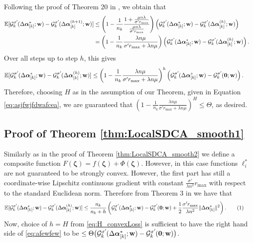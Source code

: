 \documentclass{article}
\newcommand{\Exp}{\mathbb{E}}                      %
\newcommand\tagthis{\addtocounter{equation}{1}\tag{\theequation}}
\newcommand{\wv}{ {\bf w}}
\newcommand{\alphav}{ {\boldsymbol \alpha}}
\newcommand{\zetav}{ {\boldsymbol \zeta}}
\newcommand{\0}{ {\bf 0}}
\newcommand{\vsubset}[2]{#1_{[#2]}}
\newcommand{\vc}[2]{#1^{(#2)}}                   %
\newcommand{\Ggk}{\mathcal{G}^{\sigma'}_k\hspace{-0.08em}}
\theoremstyle{plain}
\theoremstyle{definition}
\begin{document}
{Following the
 proof of Theorem 20 in \cite{richtarikBigData}, 
we obtain that
\begin{align*}
\Exp[\Ggk( 
   \vsubset{\Delta \alphav^*}{k}; \wv)
-   \Ggk( 
\vc{
  \vsubset{\Delta \alphav}{k}
  }{h+1}; \wv)
  ]
&\leq 
\left(
1-\frac1{n_k}
 \frac{1+\frac{\mu n \lambda}{\sigma' r_{\max}}}
      {\frac{\mu n \lambda}{\sigma' r_{\max}}}
\right)
\left(
\Ggk( 
   \vsubset{\Delta \alphav^*}{k};\wv)
-   \Ggk( 
\vc{
  \vsubset{\Delta \alphav}{k}
  }{h}; \wv)
\right) 
\\
&=
\left(
1-\frac1{n_k}
 \frac
      {    \lambda n \mu }
      {\sigma' r_{\max}+ \lambda n \mu }
\right)
\left(
\Ggk( 
   \vsubset{\Delta \alphav^*}{k}; \wv)
-   \Ggk( 
\vc{
  \vsubset{\Delta \alphav}{k}
  }{h}; \wv)
\right). 
\end{align*}
Over all steps up to step $h$, this gives
\begin{align*}
\Exp[\Ggk( 
   \vsubset{\Delta \alphav^*}{k}; \wv)
-   \Ggk( 
\vc{
  \vsubset{\Delta \alphav}{k}
  }{h}; \wv)
  ]
&\leq 
\left(
1-\frac1{n_k}
 \frac
      {    \lambda n \mu }
      {\sigma' r_{\max}+ \lambda n \mu }
\right)^h
\left(
\Ggk( 
   \vsubset{\Delta \alphav^*}{k}; \wv)
-   \Ggk({\bf 0}; \wv)
\right). 
\end{align*}
 Therefore, choosing 
 $H$ as in the assumption of our Theorem, given in Equation
 \eqref{eq:asjfwjfdwafcea},
 we are guaranteed that
 $\left(
1-\frac1{n_k}
 \frac
      {    \lambda n \mu }
      {\sigma' r_{\max}+ \lambda n \mu }
\right)^H \leq \Theta$, as desired. 


\subsection{Proof of Theorem \ref{thm:LocalSDCA_smooth1}
}
Similarly as in the 
proof of Theorem 
\ref{thm:LocalSDCA_smooth2} 
we define a composite function $F(\zetav)
= f(\zetav)+\Phi(\zetav) $.
However, in this case functions
$\ell_i^*$ are not guaranteed to be strongly convex.
However, the first part has still a coordinate-wise Lipschitz continuous gradient with constant
$ \frac{\sigma'}{\lambda n^2} r_{\max}$
with respect to the standard Euclidean norm.
Therefore from Theorem 3 in \cite{TTR:IMPROVRED}
we have that
\begin{align*}
\Exp[\Ggk( 
   \vsubset{\Delta \alphav^*}{k}; \wv)
-   \Ggk( 
\vc{
  \vsubset{\Delta \alphav}{k}
  }{h}; \wv)
  ]
&\leq 
 \frac{n_k}{n_k+h}
 \left(
 \Ggk( 
   \vsubset{\Delta \alphav^*}{k}; \wv)
-   \Ggk( {\bf 0}; \wv)
  +\frac12 \frac{\sigma'r_{\max}}{\lambda n^2}  \| \vsubset{\Delta \alphav^*}{k}\|^2
 \right).
 \tagthis
 \label{eq:afewfew}
\end{align*}
 Now, choice 
 of $h=H$ from 
 \eqref{eq:H_convexLoss}
 is sufficient to have
 the right hand side of
 \eqref{eq:afewfew} to be 
 $\leq  
\Theta \big(\Ggk( 
   \vsubset{\Delta \alphav^*}{k}; \wv)
-   \Ggk( {\bf 0}; \wv) \big)$.

} %


 
\end{document}
